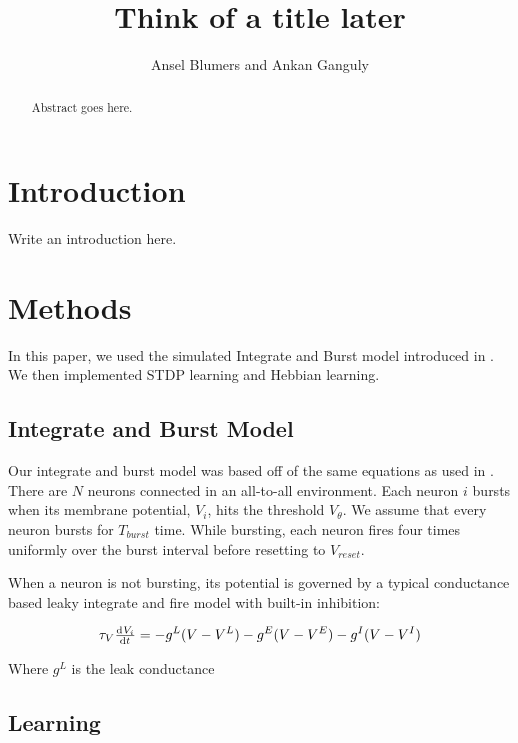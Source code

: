 \documentclass[12pt, draft]{article}
\begin{document}
\newtheorem{prop}{Proposition}

\title{Think of a title later}
\author{Ansel Blumers and Ankan Ganguly}
\maketitle

\begin{abstract}
Abstract goes here.
\end{abstract}

\newpage

\tableofcontents

\newpage

\section{Introduction}

Write an introduction here.

\section{Methods}

In this paper, we used the simulated Integrate and Burst model introduced in \cite{Fiete}. We then implemented STDP learning and Hebbian learning.

\subsection{Integrate and Burst Model}

Our integrate and burst model was based off of the same equations as used in \cite{Fiete}. There are \(N\) neurons connected in an all-to-all environment. Each neuron \(i\) bursts when its membrane potential, \(V_i\), hits the threshold \(V_\theta\). We assume that every neuron bursts for \(T_{burst}\) time. While bursting, each neuron fires four times uniformly over the burst interval before resetting to \(V_{reset}\).

When a neuron is not bursting, its potential is governed by a typical conductance based leaky integrate and fire model with built-in inhibition:

\begin{equation}
\tau_V \od{V_i}{t} = -g^L(V - V^L) - g^E(V - V^E) - g^I(V - V^I)
\end{equation}

Where \(g^L\) is the leak conductance

\subsection{Learning}
\end{document}
